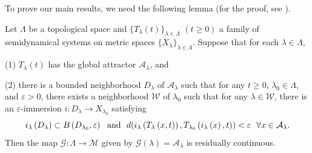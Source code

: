 \documentclass[11pt]{amsart}
\begin{document}
To prove our main results, we need the following lemma (for the proof, see \cite{LM,LNT}).
\begin{lemma}\label{lemtopo1}
    Let $\Lambda$ be a topological space and $\{T_\lambda(t)\}_{\lambda \in \Lambda}$ $(t \geq 0)$  a family of semidynamical systems on metric spaces $\{X_\lambda\}_{\lambda \in \Lambda}$. Suppose that for each $\lambda \in \Lambda$,

    (1) $T_\lambda(t)$ has the global attractor $\mathcal{A}_\lambda$, and

    (2) there is a bounded neighborhood $D_\lambda$ of $\mathcal{A}_\lambda$ such that for any $t \geq0 $, $\lambda_0 \in \Lambda$, and 
    $\varepsilon>0$, there exists a neighborhood $\mathcal{W}$ of $\lambda_0$ such that for any $\lambda \in \mathcal{W}$, there is an $\varepsilon$-immersion $i: D_\lambda \rightarrow X_{\lambda_0}$ satisfying
   $$ i_\lambda\left(D_\lambda\right) \subset B\left(D_{\lambda_{0}}, \varepsilon\right) ~~  {\rm and } ~~ d(i_\lambda\left(T_{\lambda}\left(x, t\right)\right), T_{{\lambda_0}}\left(i_{\lambda}\left(x\right), t\right ))<\varepsilon ~~\forall x \in \mathcal{A}_{\lambda}.$$
    Then the map $\mathcal{G}: \Lambda \rightarrow\mathcal{M}$ given by $\mathcal{G}(\lambda) = \mathcal{A_\lambda}$ is residually continuous.
\end{lemma}
\end{document}
